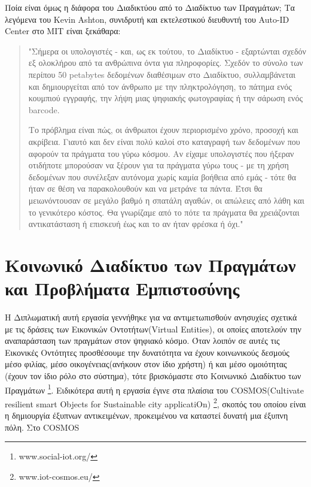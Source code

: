 Ποία είναι όμως η διάφορα του Διαδικτύου από το Διαδίκτυο των Πραγμάτων; 
\newpage
Τα λεγόμενα του Kevin Ashton, συνιδρυτή και εκτελεστικού διευθυντή του Auto-ID Center στο ΜΙΤ είναι ξεκάθαρα:%
\begin{quotation}

"Σήμερα οι υπολογιστές - και, ως εκ τούτου, το Διαδίκτυο - εξαρτώνται σχεδόν εξ ολοκλήρου από τα ανθρώπινα όντα για πληροφορίες. Σχεδόν το σύνολο των περίπου 50 petabytes δεδομένων διαθέσιμων στο Διαδίκτυο, συλλαμβάνεται και δημιουργείται από τον άνθρωπο με την πληκτρολόγηση, το πάτημα ενός κουμπιού εγγραφής, την λήψη μιας ψηφιακής φωτογραφίας ή την σάρωση ενός barcode.


Το πρόβλημα είναι πώς, οι άνθρωποι έχουν περιορισμένο χρόνο, προσοχή και ακρίβεια. Γιαυτό και δεν είναι πολύ καλοί στο καταγραφή των δεδομένων που αφορούν τα πράγματα του γύρω κόσμου. Αν είχαμε υπολογιστές που ήξεραν οτιδήποτε μπορούσαν να ξέρουν για τα πράγματα γύρω τους - με τη χρήση δεδομένων που συνέλεξαν αυτόνομα χωρίς καμία βοήθεια από εμάς - τότε θα ήταν σε θέση να παρακολουθούν και να μετράνε τα πάντα. Έτσι θα μειωνόντουσαν σε μεγάλο βαθμό η σπατάλη αγαθών, οι απώλειες από λάθη και το γενικότερο κόστος. Θα γνωρίζαμε από το πότε τα πράγματα θα χρειάζονται αντικατάσταση ή επισκευή  έως και το αν ήταν φρέσκα ή όχι." 
\end{quotation}


\section{Κοινωνικό Διαδίκτυο των Πραγμάτων και Προβλήματα Εμπιστοσύνης}

Η Διπλωματική αυτή εργασία γεννήθηκε για να αντιμετωπισθούν ανησυχίες σχετικά με τις δράσεις των Εικονικών Οντοτήτων(Virtual Entities), οι οποίες αποτελούν την αναπαράσταση των πραγμάτων στον ψηφιακό κόσμο. Όταν λοιπόν σε αυτές τις Εικονικές Οντότητες προσθέσουμε την δυνατότητα να έχουν κοινωνικούς δεσμούς μέσο φιλίας, μέσο οικογένειας(ανήκουν στον ίδιο χρήστη) ή και μέσο ομοιότητας (έχουν τον ίδιο ρόλο στο σύστημα), τότε βρισκόμαστε στο Κοινωνικό Διαδίκτυο των Πραγμάτων \footnote{www.social-iot.org/}. Ειδικότερα αυτή η εργασία έγινε στα πλαίσια του COSMOS(Cultivate resilient smart Objects for Sustainable city applicatiOn) \footnote{www.iot-cosmos.eu/}, σκοπός του οποίου είναι η δημιουργία έξυπνων αντικειμένων, προκειμένου να καταστεί δυνατή μια έξυπνη πόλη. Στο COSMOS

